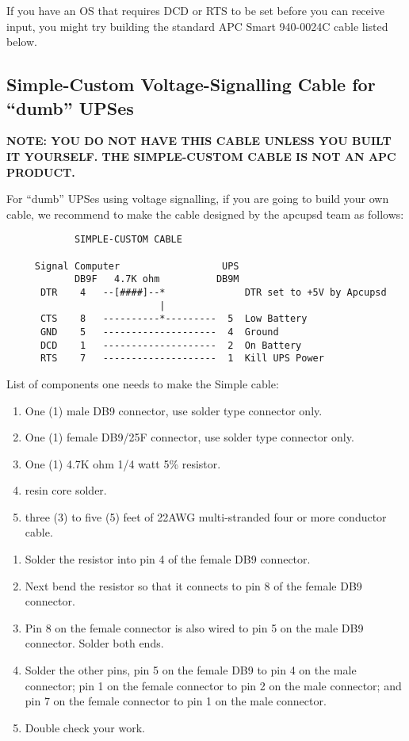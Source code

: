 If you have an OS that requires DCD or RTS to be set before you can receive
input, you might try building the standard APC Smart 940-0024C cable listed
below. 

\subsection*{Simple-Custom Voltage-Signalling Cable for ``dumb'' UPSes}

{\bf NOTE: YOU DO NOT HAVE THIS CABLE UNLESS YOU BUILT IT YOURSELF.  THE
SIMPLE-CUSTOM CABLE IS NOT AN APC PRODUCT.}  

For ``dumb'' UPSes using voltage signalling, if you are going to build your
own cable, we recommend to make the cable designed by the apcupsd team as
follows: 

\footnotesize
\begin{verbatim}
            SIMPLE-CUSTOM CABLE
     
     Signal Computer                  UPS
            DB9F   4.7K ohm          DB9M
      DTR    4   --[####]--*              DTR set to +5V by Apcupsd
                           |
      CTS    8   ----------*---------  5  Low Battery
      GND    5   --------------------  4  Ground
      DCD    1   --------------------  2  On Battery
      RTS    7   --------------------  1  Kill UPS Power
\end{verbatim}
\normalsize

List of components one needs to make the Simple cable:  

\begin{enumerate}
\item One (1) male DB9 connector, use solder type connector only.  
\item One (1) female DB9/25F connector, use solder type connector only.  
\item One (1) 4.7K ohm 1/4 watt 5\% resistor.  
\item resin core solder.  
\item three (3) to five (5) feet of 22AWG multi-stranded four or more
   conductor cable.  
   \end{enumerate}

\begin{enumerate}
\item Solder the resistor into pin 4 of the female DB9 connector.  
\item Next bend the resistor so that it connects to pin 8 of the female DB9
   connector.  
\item Pin 8 on the female connector is also wired to pin 5 on the male DB9
   connector. Solder both ends.  
\item Solder the other pins, pin 5 on the female DB9 to pin 4 on the male
   connector; pin 1 on the female connector to pin 2 on the male connector; and
   pin 7 on the female connector to pin 1 on the male connector.  
\item Double check your work.  
   \end{enumerate}

